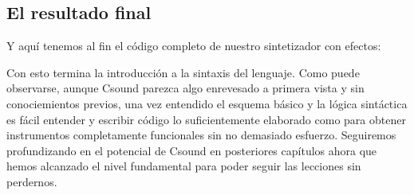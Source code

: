 \subsection{El resultado final}\label{sec:SinteCompleto}

Y aquí tenemos al fin el código completo de nuestro sintetizador con efectos:


Con esto termina la introducción a la sintaxis del lenguaje. Como puede observarse, aunque Csound parezca algo enrevesado a primera vista y sin conociemientos previos, una vez entendido el esquema básico y la lógica sintáctica es fácil entender y escribir código lo suficientemente elaborado como para obtener instrumentos completamente funcionales sin no demasiado esfuerzo.
Seguiremos profundizando en el potencial de Csound en posteriores capítulos ahora que hemos alcanzado el nivel fundamental para poder seguir las lecciones sin perdernos.
